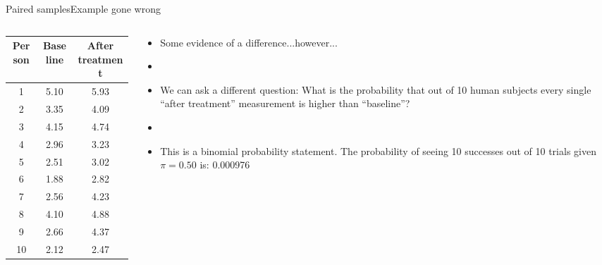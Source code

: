 \documentclass[xcolor=dvipsnames]{beamer}
\begin{document}
\begin{frame}{Paired samples}{Example gone wrong}
	\begin{columns}
		\begin{column}{.4 \textwidth}
					{\scriptsize
				\begin{tabular}{|c|c|c|}
					\hline
					\textbf{Person} & \textbf{Baseline} &  \textbf{After treatment} \\ \hline \hline
					1  &    5.10 &   5.93  \\ \hline 
					2  &    3.35 &   4.09 \\ \hline 
					3  &   4.15  &  4.74  \\ \hline 
					4  &   2.96  &  3.23  \\ \hline 
					5  &    2.51 &   3.02 \\ \hline 
					6  &   1.88  &  2.82  \\ \hline 
					7  &   2.56  &  4.23 \\ \hline 
					8  &    4.10 &   4.88 \\ \hline 
					9  &   2.66  &  4.37  \\ \hline 
					10  &    2.12  &  2.47 \\ \hline 
				\end{tabular}
			}
		\end{column}
		\begin{column}{.6 \textwidth}
			\begin{itemize}
				\item Some evidence of a difference...however...
				\item[]
				\item We can ask a different question: What is the probability that out of 10 human subjects every single ``after treatment'' measurement is higher than ``baseline''?
				\item[]
				\item This is a binomial probability statement. The probability of seeing 10 successes out of 10 trials given $\pi = 0.50$ is: 0.000976
			\end{itemize}
		\end{column}
	\end{columns}
\end{frame}
\end{document}
